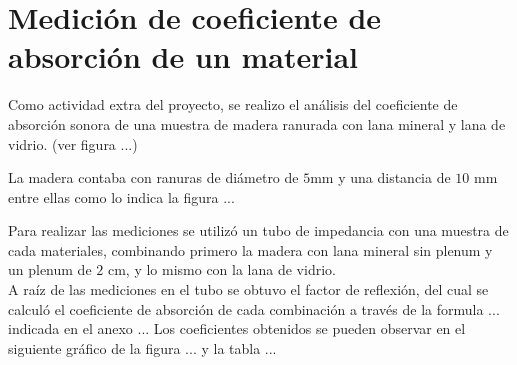 \section{Medición de coeficiente de absorción de un material}
Como actividad extra del proyecto, se realizo el análisis del coeficiente de absorción sonora de una muestra de madera ranurada con lana mineral y lana de vidrio. (ver figura ...)

La madera contaba con ranuras de diámetro de $5$mm y una distancia de $10$ mm entre ellas como lo indica la figura ...


Para realizar las mediciones se utilizó un tubo de impedancia con una muestra de cada materiales, combinando primero la madera con lana mineral sin plenum y un plenum de $2$ cm, y lo mismo con la lana de vidrio.\\
A raíz de las mediciones en el tubo se obtuvo el factor de reflexión, del cual se calculó el coeficiente de absorción de cada combinación a través de la formula ... indicada en el anexo ... Los coeficientes obtenidos se pueden observar en el siguiente gráfico de la figura ... y la tabla ...
